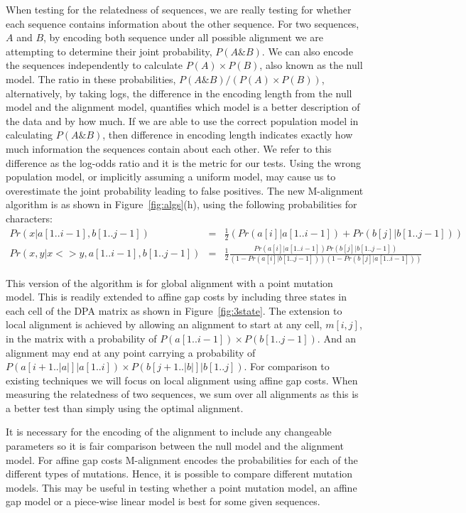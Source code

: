 \documentclass[a4paper,11pt,oneside]{article}
\begin{document}
When testing for the relatedness of sequences, we are really testing for
whether each sequence contains information about the other sequence.  For two
sequences, $A$ and $B$, by encoding both sequence under all possible alignment
we are attempting to determine their joint probability, $P(A \& B)$.  We can
also encode the sequences independently to calculate $P(A) \times P(B)$, also
known as the null model.  The ratio in these probabilities, $P(A \& B) / (P(A)
\times P(B))$, alternatively, by taking logs, the difference in the encoding
length from the null model and the alignment model, quantifies which model is
a better description of the data and by how much.  If we are able to use the
correct population model in calculating $P(A\&B)$, then difference in encoding
length indicates exactly how much information the sequences contain about each
other.  We refer to this difference as the log-odds ratio and it is the metric
for our tests. Using the wrong population model, or implicitly assuming a
uniform model, may cause us to overestimate the joint probability leading to
false positives.
\newpage
The new M-alignment algorithm is as shown in Figure~\ref{fig:algs}(h), using
the following probabilities for characters:
\begin{eqnarray*}
Pr(x|a[1..i-1],b[1..j-1]) & = & \frac{1}{2} ( Pr(a[i]|a[1..i-1]) +
Pr(b[j]|b[1..j-1]) ) \\
Pr(x,y|x<>y,a[1..i-1],b[1..j-1]) & = & \frac{1}{2}\frac{Pr(a[i]|a[1..i-1])
Pr(b[j]|b[1..j-1])}{(1-Pr(a[i]|b[1..j-1]))(1-Pr(b[j]|a[1..i-1]))}
\end{eqnarray*}

This version of the algorithm is for global alignment with a point mutation
model.  This is readily extended to affine gap costs by including three states
in each cell of the DPA matrix as shown in Figure~\ref{fig:3state}.  The
extension to local alignment is achieved by allowing an alignment to start at
any cell, $m[i,j]$, in the matrix with a probability of $P(a[1..i-1]) \times
P(b[1..j-1])$.  And an alignment may end at any point carrying a probability
of $P(a[i+1..|a|] | a[1..i]) \times P(b[j+1..|b|] | b[1..j])$.  For comparison
to existing techniques we will focus on local alignment using affine gap
costs.  When measuring the relatedness of two sequences, we sum over all
alignments as this is a better test than simply using the optimal alignment.

It is necessary for the encoding of the alignment to include any changeable
parameters so it is fair comparison between the null model and the alignment
model.  For affine gap costs M-alignment encodes the probabilities for each of
the different types of mutations.  Hence, it is possible to compare different
mutation models.  This may be useful in testing whether a point mutation
model, an affine gap model or a piece-wise linear model is best for some given
sequences.
\end{document}

